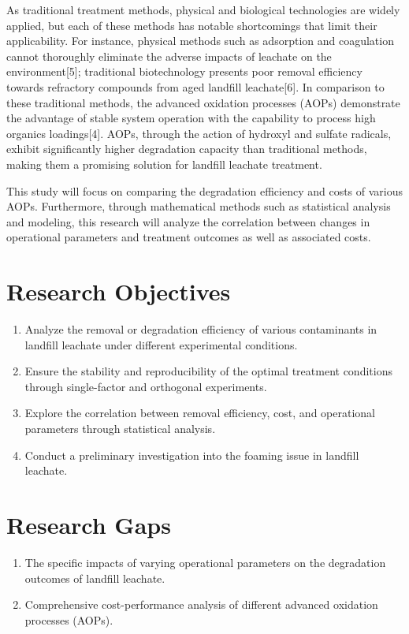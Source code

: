 \documentclass[a4paper]{article}
\begin{document}
As traditional treatment methods, physical and biological technologies are widely applied, but each of these methods has notable shortcomings that limit their applicability. For instance, physical methods such as adsorption and coagulation cannot thoroughly eliminate the adverse impacts of leachate on the environment{[}5{]}; traditional biotechnology presents poor removal efficiency towards refractory compounds from aged landfill leachate{[}6{]}. In comparison to these traditional methods, the advanced oxidation processes (AOPs) demonstrate the advantage of stable system operation with the capability to process high organics loadings{[}4{]}. AOPs, through the action of hydroxyl and sulfate radicals, exhibit significantly higher degradation capacity than traditional methods, making them a promising solution for landfill leachate treatment.

This study will focus on comparing the degradation efficiency and costs of various AOPs. Furthermore, through mathematical methods such as statistical analysis and modeling, this research will analyze the correlation between changes in operational parameters and treatment outcomes as well as associated costs.

\section{Research Objectives}

\begin{enumerate}
    \item Analyze the removal or degradation efficiency of various contaminants in landfill leachate under different experimental conditions.  
    \item Ensure the stability and reproducibility of the optimal treatment conditions through single-factor and orthogonal experiments.  
    \item Explore the correlation between removal efficiency, cost, and operational parameters through statistical analysis.  
    \item Conduct a preliminary investigation into the foaming issue in landfill leachate.
\end{enumerate}

\section{Research Gaps}

\begin{enumerate}
    \item The specific impacts of varying operational parameters on the degradation outcomes of landfill leachate.
    \item Comprehensive cost-performance analysis of different advanced oxidation processes (AOPs).
\end{enumerate}
\end{document}
